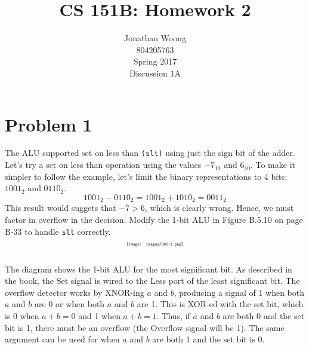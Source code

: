\documentclass[10pt,letterpaper]{article}
\date{\displaydate{date}}
\begin{document}
\title{CS 151B: Homework 2}
\author{
	Jonathan Woong\\
	804205763\\
	Spring 2017\\
	Discussion 1A}
\maketitle
\pagebreak


\section{Problem 1}
The ALU supported set on less than \texttt{(slt)} using just the sign bit of the adder. Let's try a set on less than operation using the values $-7_{10}$ and $6_{10}$. To make it simpler to follow the example, let's limit the binary representations to 4 bits: $1001_{2}$ and $0110_{2}$.
\[1001_2 - 0110_2 = 1001_2 + 1010_2 = 0011_2\]
This result would suggets that $-7>6$, which is clearly wrong. Hence, we must factor in overflow in the decision. Modify the 1-bit ALU in Figure B.5.10 on page B-33 to handle \texttt{slt} correctly.\\
\[\scalebox{0.5}{
\texttt{[image: images/hw2-1.png]}
}\]\\
The diagram shows the 1-bit ALU for the most significant bit. As described in the book, the Set signal is wired to the Less port of the least significant bit. The overflow detector works by XNOR-ing $a$ and $b$, producing a signal of 1 when both $a$ and $b$ are 0 or when both $a$ and $b$ are 1. This is XOR-ed with the set bit, which is 0 when $a + b=0$ and 1 when $a+b=1$. Thus, if $a$ and $b$ are both 0 and the set bit is 1, there must be an overflow (the Overflow signal will be 1). The same argument can be used for when $a$ and $b$ are both 1 and the set bit is 0.
\pagebreak

\end{document}
